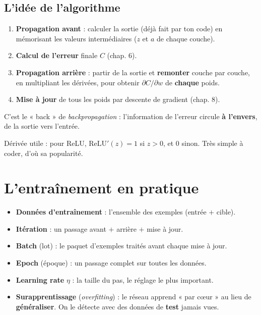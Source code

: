 \documentclass[11pt]{article}
\begin{document}
\subsection{L'idée de l'algorithme}
\begin{enumerate}[leftmargin=2em]
  \item \textbf{Propagation avant} : calculer la sortie (déjà fait par ton code) en
  mémorisant les valeurs intermédiaires ($z$ et $a$ de chaque couche).
  \item \textbf{Calcul de l'erreur} finale $C$ (chap. 6).
  \item \textbf{Propagation arrière} : partir de la sortie et \textbf{remonter}
  couche par couche, en multipliant les dérivées, pour obtenir
  $\partial C/\partial w$ de \textbf{chaque} poids.
  \item \textbf{Mise à jour} de tous les poids par descente de gradient (chap. 8).
\end{enumerate}
C'est le « back » de \emph{backpropagation} : l'information de l'erreur circule
\textbf{à l'envers}, de la sortie vers l'entrée.

\begin{retenir}
Dérivée utile : pour ReLU, $\mathrm{ReLU}'(z) = 1$ si $z > 0$, et $0$ sinon. Très
simple à coder, d'où sa popularité.
\end{retenir}

\section{L'entraînement en pratique}

\begin{itemize}[leftmargin=2em]
  \item \textbf{Données d'entraînement} : l'ensemble des exemples (entrée $+$ cible).
  \item \textbf{Itération} : un passage avant $+$ arrière $+$ mise à jour.
  \item \textbf{Batch} (lot) : le paquet d'exemples traités avant chaque mise à jour.
  \item \textbf{Epoch} (époque) : un passage complet sur toutes les données.
  \item \textbf{Learning rate} $\eta$ : la taille du pas, le réglage le plus important.
  \item \textbf{Surapprentissage} (\emph{overfitting}) : le réseau apprend « par
  cœur » au lieu de \textbf{généraliser}. On le détecte avec des données de
  \textbf{test} jamais vues.
\end{itemize}
\end{document}
